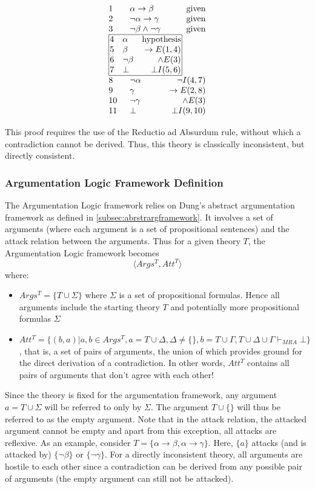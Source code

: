 \documentclass[11pt,twoside,a4paper]{report}
\begin{document}
\[\vbox{\offinterlineskip\halign{
&\tabskip=1.5em#\strut&$#$\hfil\tabskip=1em&\hfil$#$\tabskip=0em\cr
%
1&\alpha\rightarrow\beta&\mbox{given}\cr
2&\neg\alpha\rightarrow\gamma&\mbox{given}\cr
3&\neg\beta\wedge\neg\gamma&\mbox{given}\cr
%
\multispan3\vbox{\halign{
\vrule#&&\hskip.1em\tabskip=1em#\strut&$#$\hfil\tabskip=1em&\hfil$#$\hskip0.1em\tabskip=0em&\vrule#\cr
\noalign{\hrule}
%
&4&\alpha&\mbox{hypothesis}&\cr
&5&\beta&\rightarrow E(1,4)&\cr
&6&\neg\beta&\wedge E(3)&\cr
&7&\bot&\bot I(5,6)&\cr
%
\noalign{\hrule}}}\,\cr
%
8&\neg\alpha&\neg I(4,7)\cr
9&\gamma&\rightarrow E(2,8)\cr
10&\neg\gamma&\wedge E(3)\cr
11&\bot&\bot I(9,10)\cr
}}\]

This proof requires the use of the Reductio ad Absurdum rule, without which a contradiction cannot be derived. Thus, this theory is classically inconsistent, but directly consistent.

\subsubsection{Argumentation Logic Framework Definition}
\label{subsec:alfdef}
The Argumentation Logic framework relies on Dung's abstract argumentation framework as defined in \autoref{subsec:abrstrargframework}. It involves a set of arguments (where each argument is a set of propositional sentences) and the attack relation between the arguments. Thus for a given theory $T$, the Argumentation Logic framework becomes
\[\langle Args^T, Att^T\rangle\]
where:
\begin{itemize}
\item
$Args^T = \{T\cup\Sigma\}$ where $\Sigma$ is a set of propositional formulas. Hence all arguments include the starting theory $T$ and potentially more propositional formulas $\Sigma$
\item
$Att^T = \{(b,a) | a,b \in Args^T, a = T\cup\Delta, \Delta\neq\{\}, b = T\cup\Gamma, T\cup\Delta\cup\Gamma\vdash_{MRA}\bot\}$, that is, a set of pairs of arguments, the union of which provides ground for the direct derivation of a contradiction. In other words, $Att^T$ contains all pairs of arguments that don't agree with each other!
\end{itemize}

Since the theory is fixed for the argumentation framework, any argument $a = T\cup\Sigma$  will be referred to only by $\Sigma$. The argument $T\cup\{\}$ will thus be referred to as the empty argument. Note that in the attack relation, the attacked argument cannot be empty and apart from this exception, all attacks are reflexive.
As an example, consider $T = \{\alpha\rightarrow\beta, \alpha\rightarrow\gamma\}$. Here, $\{a\}$ attacks (and is attacked by) $\{\neg\beta\}$ or $\{\neg\gamma\}$. For a directly inconsistent theory, all arguments are hostile to each other since a contradiction can be derived from any possible pair of arguments (the empty argument can still not be attacked).
\end{document}
